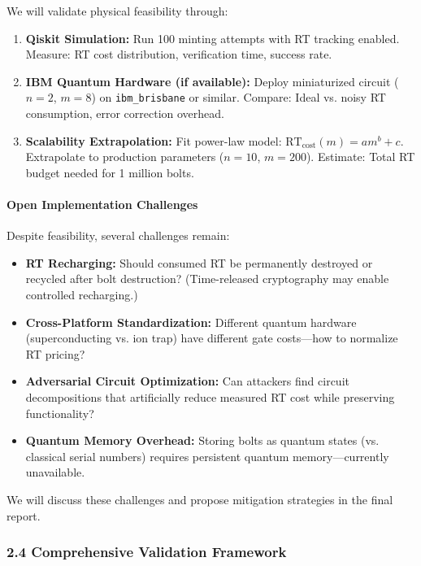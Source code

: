 \documentclass[a4paper,10.5pt,twoside]{article}
\begin{document}
We will validate physical feasibility through:
\begin{enumerate}
    \item \textbf{Qiskit Simulation:}  
    Run 100 minting attempts with RT tracking enabled.  
    Measure: RT cost distribution, verification time, success rate.
    
    \item \textbf{IBM Quantum Hardware (if available):}  
    Deploy miniaturized circuit ($n=2$, $m=8$) on \texttt{ibm\_brisbane} or similar.  
    Compare: Ideal vs. noisy RT consumption, error correction overhead.
    
    \item \textbf{Scalability Extrapolation:}  
    Fit power-law model: $\text{RT}_{\text{cost}}(m) = am^b + c$.  
    Extrapolate to production parameters ($n=10$, $m=200$).  
    Estimate: Total RT budget needed for 1 million bolts.
\end{enumerate}

\paragraph{Open Implementation Challenges}

Despite feasibility, several challenges remain:
\begin{itemize}
    \item \textbf{RT Recharging:} Should consumed RT be permanently destroyed or recycled after bolt destruction? (Time-released cryptography may enable controlled recharging.)
    \item \textbf{Cross-Platform Standardization:} Different quantum hardware (superconducting vs. ion trap) have different gate costs—how to normalize RT pricing?
    \item \textbf{Adversarial Circuit Optimization:} Can attackers find circuit decompositions that artificially reduce measured RT cost while preserving functionality?
    \item \textbf{Quantum Memory Overhead:} Storing bolts as quantum states (vs. classical serial numbers) requires persistent quantum memory—currently unavailable.
\end{itemize}

We will discuss these challenges and propose mitigation strategies in the final report.

\subsubsection*{2.4 Comprehensive Validation Framework}
\end{document}
